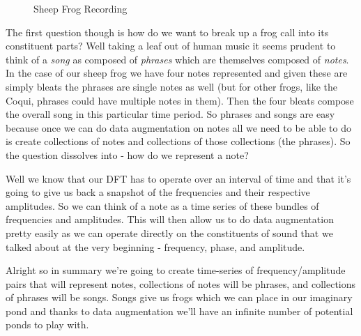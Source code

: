 \documentclass[10pt,a5paper]{book}
\begin{document}
\begin{figure}[!htb]
\caption{\label{fig:my-label} Sheep Frog Recording}
\end{figure}

The first question though is how do we want to break up a frog call into its constituent parts? Well taking a leaf out of human music it seems prudent to think of a \textit{song} as composed of \textit{phrases} which are themselves composed of \textit{notes}. In the case of our sheep frog we have four notes represented and given these are simply bleats the phrases are single notes as well (but for other frogs, like the Coqui, phrases could have multiple notes in them). Then the four bleats compose the overall song in this particular time period. So phrases and songs are easy because once we can do data augmentation on notes all we need to be able to do is create collections of notes and collections of those collections (the phrases). So the question dissolves into - how do we represent a note?

Well we know that our DFT has to operate over an interval of time and that it's going to give us back a snapshot of the frequencies and their respective amplitudes. So we can think of a note as a time series of these bundles of frequencies and amplitudes. This will then allow us to do data augmentation pretty easily as we can operate directly on the constituents of sound that we talked about at the very beginning - frequency, phase, and amplitude. 

Alright so in summary we're going to create time-series of frequency/amplitude pairs that will represent notes, collections of notes will be phrases, and collections of phrases will be songs. Songs give us frogs which we can place in our imaginary pond and thanks to data augmentation we'll have an infinite number of potential ponds to play with. 
\end{document}
